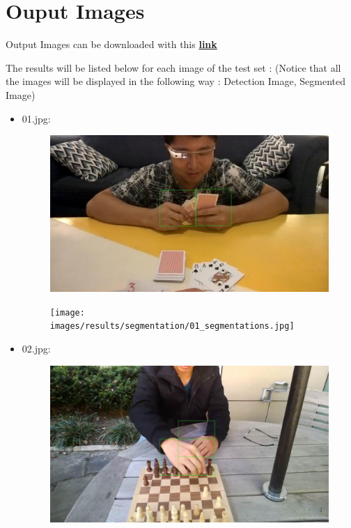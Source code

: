 \section{Ouput Images}
Output Images can be downloaded with this  \href{https://drive.google.com/drive/folders/1581peBMkMdzrZaqiWI9ccUjwJi8Zn2wc?usp=sharing}{\textbf{link}}

\iffalse
The results will be listed below for each image of the test set : \newline (Notice that all the images will be displayed in the following way : Detection Image, Segmented Image)
\begin{itemize}
    \item 01.jpg:
        \begin{figure}[!htb]
            \begin{minipage}{0.5\textwidth}
                \centering
                \includegraphics[scale = 0.205]{images/results/detection/01_detections.jpg}
            \end{minipage}\hfill
            \begin{minipage}{0.5\textwidth}
                \centering
                \texttt{[image: images/results/segmentation/01\_segmentations.jpg]}
            \end{minipage}
        \end{figure}
    \item 02.jpg:
        \begin{figure}[!htb]
            \begin{minipage}{0.5\textwidth}
                \centering
                \includegraphics[scale = 0.205]{images/results/detection/02_detections.jpg}

\end{minipage}
\end{figure}
\end{itemize}
